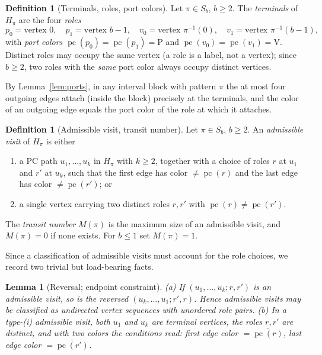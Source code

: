 \documentclass[11pt]{article}
\newtheorem{lemma}[theorem]{Lemma}
\theoremstyle{definition}
\newtheorem{definition}[theorem]{Definition}
\newcommand{\inv}[1]{#1^{-1}}
\DeclareMathOperator{\pc}{pc}
\begin{document}
\begin{definition}[Terminals, roles, port colors]\label{def:terminals}
Let $\pi \in S_b$, $b \ge 2$. The \emph{terminals} of $H_\pi$ are the four
\emph{roles}
\[
p_0 = \text{vertex } 0, \quad
p_1 = \text{vertex } b-1, \quad
v_0 = \text{vertex } \inv\pi(0), \quad
v_1 = \text{vertex } \inv\pi(b-1),
\]
with \emph{port colors} $\pc(p_0) = \pc(p_1) = \mathrm P$ and
$\pc(v_0) = \pc(v_1) = \mathrm V$. Distinct roles may occupy the same vertex (a role
is a label, not a vertex); since $b \ge 2$, two roles with the \emph{same} port color
always occupy distinct vertices.
\end{definition}

By Lemma~\ref{lem:ports}, in any interval block with pattern $\pi$ the at most four
outgoing edges attach (inside the block) precisely at the terminals, and the color of
an outgoing edge equals the port color of the role at which it attaches.

\begin{definition}[Admissible visit, transit number]\label{def:M}
Let $\pi \in S_b$, $b \ge 2$. An \emph{admissible visit} of $H_\pi$ is either
\begin{enumerate}
\item[(i)] a PC path $u_1, \dots, u_k$ in $H_\pi$ with $k \ge 2$, together with a
choice of roles $r$ at $u_1$ and $r'$ at $u_k$, such that the first edge has color
$\ne \pc(r)$ and the last edge has color $\ne \pc(r')$; or
\item[(ii)] a single vertex carrying two distinct roles $r, r'$ with
$\pc(r) \ne \pc(r')$.
\end{enumerate}
The \emph{transit number} $M(\pi)$ is the maximum size of an admissible visit, and
$M(\pi) = 0$ if none exists. For $b \le 1$ set $M(\pi) = 1$.
\end{definition}

Since a classification of admissible visits must account for the role choices, we
record two trivial but load-bearing facts.

\begin{lemma}[Reversal; endpoint constraint]\label{lem:reversal}
(a) If $(u_1, \dots, u_k; r, r')$ is an admissible visit, so is the reversed
$(u_k, \dots, u_1; r', r)$. Hence admissible visits may be classified as undirected
vertex sequences with unordered role pairs.
(b) In a type-(i) admissible visit, both $u_1$ and $u_k$ are terminal vertices, the
roles $r, r'$ are distinct, and with two colors the conditions read: first edge color
$= \overline{\pc(r)}$, last edge color $= \overline{\pc(r')}$.
\end{lemma}
\end{document}

